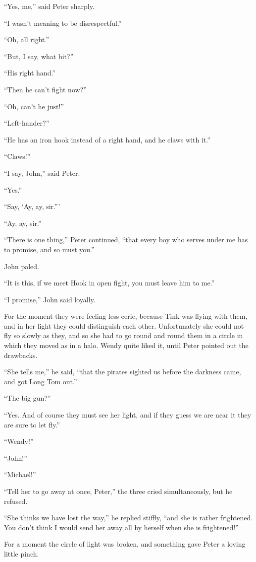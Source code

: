 ``Yes, me,'' said Peter sharply.

``I wasn't meaning to be disrespectful.''

``Oh, all right.''

``But, I say, what bit?''

``His right hand.''

``Then he can't fight now?''

``Oh, can't he just!''

``Left-hander?''

``He has an iron hook instead of a right hand, and he claws with it.''

``Claws!''

``I say, John,'' said Peter.

``Yes.''

``Say, ‘Ay, ay, sir.'''

``Ay, ay, sir.''

``There is one thing,'' Peter continued, ``that every boy who serves under
me has to promise, and so must you.''

John paled.

``It is this, if we meet Hook in open fight, you must leave him to me.''

``I promise,'' John said loyally.

For the moment they were feeling less eerie, because Tink was flying
with them, and in her light they could distinguish each other.
Unfortunately she could not fly so slowly as they, and so she had to go
round and round them in a circle in which they moved as in a halo.
Wendy quite liked it, until Peter pointed out the drawbacks.

``She tells me,'' he said, ``that the pirates sighted us before the
darkness came, and got Long Tom out.''

``The big gun?''

``Yes. And of course they must see her light, and if they guess we are
near it they are sure to let fly.''

``Wendy!''

``John!''

``Michael!''

``Tell her to go away at once, Peter,'' the three cried simultaneously,
but he refused.

``She thinks we have lost the way,'' he replied stiffly, ``and she is
rather frightened. You don't think I would send her away all by herself
when she is frightened!''

For a moment the circle of light was broken, and something gave Peter a
loving little pinch.

